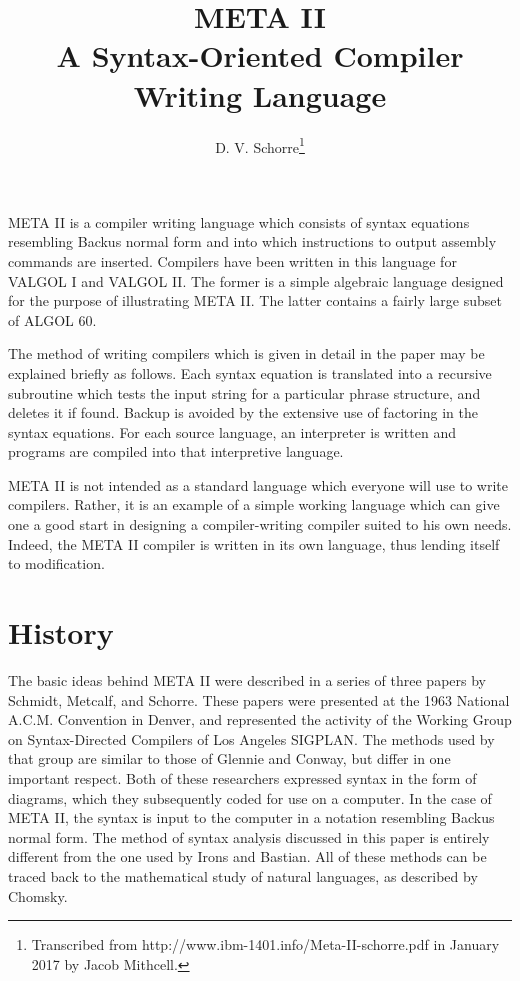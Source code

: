 \documentclass[notitlepage,twocolumn]{report}
\title{META II \\ \large A Syntax-Oriented Compiler Writing Language}
\author{D. V. Schorre\footnote{Transcribed from http://www.ibm-1401.info/Meta-II-schorre.pdf in January 2017 by Jacob Mithcell.}}
\date{}
\begin{document}
\twocolumn
\maketitle


META II is a compiler writing language which consists of syntax
equations resembling Backus normal form and into which instructions to
output assembly commands are inserted. Compilers have been written in
this language for VALGOL I and VALGOL II. The former is a simple
algebraic language designed for the purpose of illustrating META
II. The latter contains a fairly large subset of ALGOL 60.

The method of writing compilers which is given in detail in the paper
may be explained briefly as follows. Each syntax equation is
translated into a recursive subroutine which tests the input string
for a particular phrase structure, and deletes it if found. Backup is
avoided by the extensive use of factoring in the syntax equations. For
each source language, an interpreter is written and programs are
compiled into that interpretive language.

META II is not intended as a standard language which everyone will use
to write compilers. Rather, it is an example of a simple working
language which can give one a good start in designing a
compiler-writing compiler suited to his own needs. Indeed, the META II
compiler is written in its own language, thus lending itself to
modification.

\section*{History}

The basic ideas behind META II were described in a series of three
papers by Schmidt, Metcalf, and
Schorre. These papers were presented at the 1963
National A.C.M. Convention in Denver, and represented the activity of
the Working Group on Syntax-Directed Compilers of Los Angeles
SIGPLAN. The methods used by that group are similar to those of
Glennie and Conway, but differ in one important respect. Both of these
researchers expressed syntax in the form of diagrams, which they
subsequently coded for use on a computer. In the case of META II, the
syntax is input to the computer in a notation resembling Backus normal
form. The method of syntax analysis discussed in this paper is
entirely different from the one used by Irons and
Bastian. All of these methods can be traced back to the
mathematical study of natural languages, as described by
Chomsky.
\end{document}
